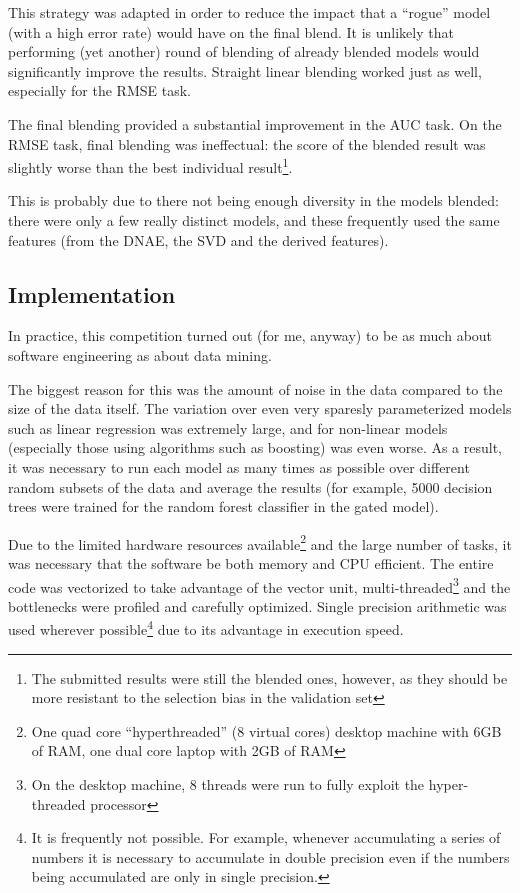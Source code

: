 \documentclass{article}
\begin{document}
This strategy was adapted in order to reduce the impact that a ``rogue'' model (with a high error rate) would have on the final blend.  It is unlikely that performing (yet another) round of blending of already blended models would significantly improve the results.  Straight linear blending worked just as well, especially for the RMSE task.

The final blending provided a substantial improvement in the AUC task.  On the RMSE task, final blending was ineffectual: the score of the blended result was slightly worse than the best individual result\footnote{The submitted results were still the blended ones, however, as they should be more resistant to the selection bias in the validation set}.

This is probably due to there not being enough diversity in the models blended: there were only a few really distinct models, and these frequently used the same features (from the DNAE, the SVD and the derived features).

\subsection{Implementation}

In practice, this competition turned out (for me, anyway) to be as much about software engineering as about data mining.

The biggest reason for this was the amount of noise in the data compared to the size of the data itself.  The variation over even very sparesly parameterized models such as linear regression was extremely large, and for non-linear models (especially those using algorithms such as boosting) was even worse.  As a result, it was necessary to run each model as many times as possible over different random subsets of the data and average the results (for example, 5000 decision trees were trained for the random forest classifier in the gated model).

Due to the limited hardware resources available\footnote{One quad core ``hyperthreaded'' (8 virtual cores) desktop machine with 6GB of RAM, one dual core laptop with 2GB of RAM} and the large number of tasks, it was necessary that the software be both memory and CPU efficient.
The entire code was vectorized to take advantage of the vector unit, multi-threaded\footnote{On the desktop machine, 8 threads were run to fully exploit the hyper-threaded processor} and the bottlenecks were profiled and carefully optimized.  Single precision arithmetic was used wherever possible\footnote{It is frequently not possible.  For example, whenever accumulating a series of numbers it is necessary to accumulate in double precision even if the numbers being accumulated are only in single precision.} due to its advantage in execution speed.
\end{document}
